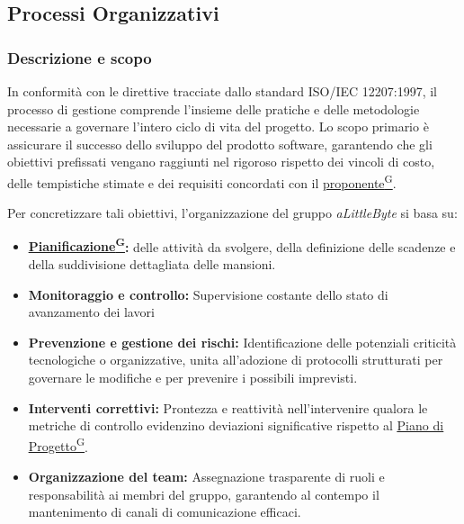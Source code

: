 \documentclass[a4paper,12pt]{article}
\providecommand{\glslink}[2]{\href{https://alittlebyte-19.github.io/Documentazione/glossario.html\#gls-#1}{\underline{#2}\textsuperscript{\scriptsize G}}}
\begin{document}
\subsection{Processi Organizzativi}

\subsubsection{Descrizione e scopo}

In conformità con le direttive tracciate dallo standard ISO/IEC 12207:1997, il processo di gestione comprende l'insieme delle pratiche e delle metodologie necessarie a governare l'intero ciclo di vita del progetto. Lo scopo primario è assicurare il successo dello sviluppo del prodotto software, garantendo che gli obiettivi prefissati vengano raggiunti nel rigoroso rispetto dei vincoli di costo, delle tempistiche stimate e dei requisiti concordati con il \glslink{committente-proponente}{proponente}.

Per concretizzare tali obiettivi, l'organizzazione del gruppo \textit{aLittleByte} si basa su:

\begin{itemize}
    \item \textbf{\glslink{pianificazione}{Pianificazione}:} delle attività da svolgere, della definizione delle scadenze e della suddivisione dettagliata delle mansioni.
    
    \item \textbf{Monitoraggio e controllo:} Supervisione costante dello stato di avanzamento dei lavori
    
    \item \textbf{Prevenzione e gestione dei rischi:} Identificazione delle potenziali criticità tecnologiche o organizzative, unita all'adozione di protocolli strutturati per governare le modifiche e per prevenire i possibili imprevisti.
    
    \item \textbf{Interventi correttivi:} Prontezza e reattività nell'intervenire qualora le metriche di controllo evidenzino deviazioni significative rispetto al \glslink{piano-di-progetto}{Piano di Progetto}.
    
    \item \textbf{Organizzazione del team:} Assegnazione trasparente di ruoli e responsabilità ai membri del gruppo, garantendo al contempo il mantenimento di canali di comunicazione efficaci.
\end{itemize}
\end{document}
